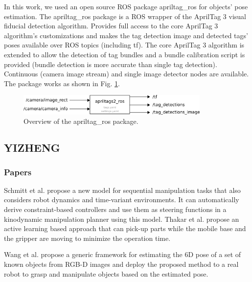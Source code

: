 \documentclass[12pt,draftclsnofoot,onecolumn]{IEEEtran}
\begin{document}
	In this work, we used an open source ROS package apriltag\_ros for objects' pose estimation. The apriltag\_ros package is a ROS wrapper of the AprilTag 3 visual fiducial detection algorithm. Provides full access to the core AprilTag 3 algorithm's customizations and makes the tag detection image and detected tags' poses available over ROS topics (including tf). The core AprilTag 3 algorithm is extended to allow the detection of tag bundles and a bundle calibration script is provided (bundle detection is more accurate than single tag detection). Continuous (camera image stream) and single image detector nodes are available. The package works as shown in Fig. \ref{apriltag}. 
	
	
	\begin{figure}[H]  %
		\centering
		\includegraphics[width=0.85\textwidth]{img/apriltag.png}
		\caption{
			Overview of the apriltag\_ros package.
		}
		\label{apriltag}
	\end{figure}
	
	
	\subsection{YIZHENG}
	\subsubsection{Papers}
	
	Schmitt et al.\cite{8793824} propose a new model for sequential manipulation tasks that also considers robot dynamics and time-variant environments.
	It can automatically derive constraint-based controllers and use them as steering functions in a kinodynamic manipulation planner using this model.
	Thakar et al.\cite{8793501} propose an active learning based approach that can pick-up parts while the mobile base and the gripper are moving to minimize the operation time.
	
	Wang et al.\cite{Wang_2019_CVPR} propose a generic framework for estimating the 6D pose of a set of known objects from RGB-D images and deploy the proposed method to a real robot to grasp and manipulate objects based on the estimated pose.
	
\end{document}
